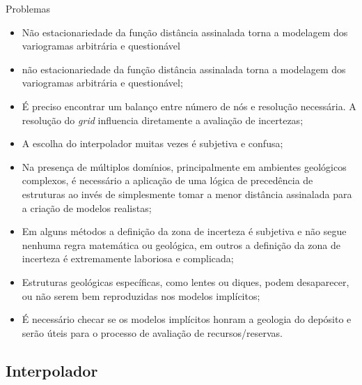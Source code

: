 \documentclass[aspectratio=169]{beamer}
\begin{document}
\begin{frame}[allowframebreaks]{Problemas}

	\begin{itemize}

		\item Não estacionariedade da função distância assinalada torna a modelagem dos variogramas arbitrária e questionável
		\item não estacionariedade da função distância assinalada torna a modelagem dos variogramas arbitrária e questionável;
		\item É preciso encontrar um balanço entre número de nós e resolução necessária. A resolução do \textit{grid} influencia diretamente a avaliação de incertezas;
		\item A escolha do interpolador muitas vezes é subjetiva e confusa;
		\item Na presença de múltiplos domínios, principalmente em ambientes geológicos complexos, é necessário a aplicação de uma lógica de precedência de estruturas ao invés de simplesmente tomar a menor distância assinalada para a criação de modelos realistas;
		\item Em alguns métodos a definição da zona de incerteza é subjetiva e não segue nenhuma regra matemática ou geológica, em outros a definição da zona de incerteza é extremamente laboriosa e complicada;
		\item Estruturas geológicas específicas, como lentes ou diques, podem desaparecer, ou não serem bem reproduzidas nos modelos implícitos;
		\item É necessário checar se os modelos implícitos honram a geologia do depósito e serão úteis para o processo de avaliação de recursos/reservas.
	\end{itemize}

\end{frame}

\subsection{Interpolador}
\end{document}
